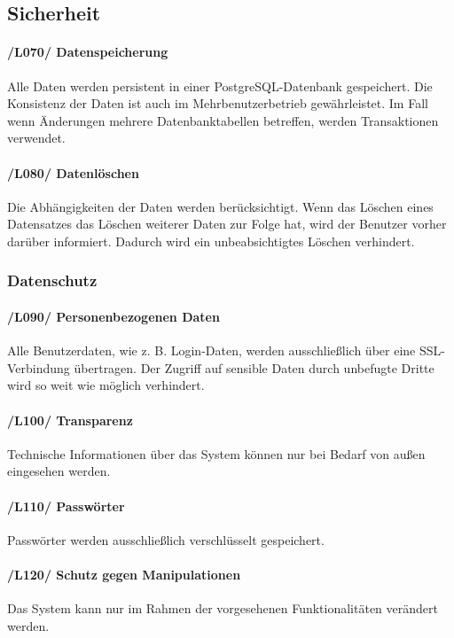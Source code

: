 \documentclass{article}
\begin{document}
      
\subsection{Sicherheit}
   \paragraph{/L070/ \label{070} Datenspeicherung}
   Alle Daten werden persistent in einer PostgreSQL-Datenbank gespeichert. Die Konsistenz der Daten ist auch im Mehrbenutzerbetrieb gewährleistet. Im Fall wenn  Änderungen mehrere Datenbanktabellen betreffen, werden Transaktionen verwendet.
  
   \paragraph{/L080/ \label{080} Datenlöschen}
   Die Abhängigkeiten der Daten werden berücksichtigt. Wenn das Löschen eines Datensatzes das Löschen weiterer Daten zur Folge hat, wird der Benutzer vorher darüber informiert. Dadurch wird ein unbeabsichtigtes Löschen verhindert.
  
\subsubsection{Datenschutz}
	\paragraph{/L090/ \label{L090} 
	Personenbezogenen Daten} 
	Alle Benutzerdaten, wie z. B. Login-Daten, werden ausschließlich über eine SSL-Verbindung übertragen. Der Zugriff auf sensible Daten durch unbefugte Dritte wird so weit wie möglich verhindert.
		    
	\paragraph{/L100/ \label{L100} Transparenz}
    Technische Informationen über das System können nur bei Bedarf von außen eingesehen werden.
		   
   \paragraph{/L110/ \label{L110} Passwörter} Passwörter werden ausschließlich verschlüsselt gespeichert.
   
    \paragraph{/L120/ \label{L120} Schutz gegen Manipulationen} Das System kann nur im Rahmen der vorgesehenen Funktionalitäten verändert werden.
   
\end{document}
